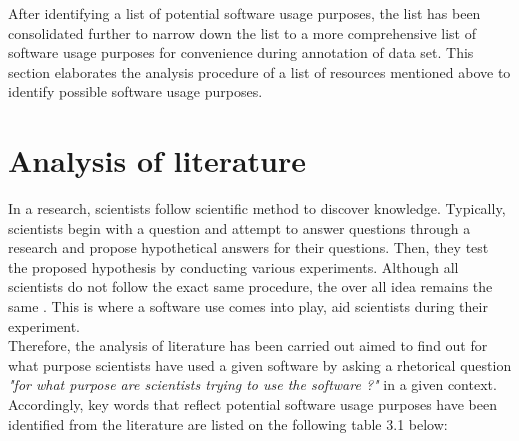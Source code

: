 After identifying a list of potential software usage purposes, the list has been consolidated further to narrow down the list to a more comprehensive list of software usage purposes for convenience during annotation of data set. This section elaborates the analysis procedure of a list of resources mentioned above to identify possible software usage purposes. \\
 

\section{Analysis of literature }
\label{sec:purpose:literatures}

In a research, scientists follow scientific method to discover knowledge. Typically, scientists begin with a question and attempt to answer questions through a research and propose hypothetical answers for their questions. Then, they test the proposed hypothesis by conducting various experiments. Although all scientists do not follow the exact same procedure, the over all idea remains the same \citep{enwiki:1061107378}. This is where a software use comes into play, aid scientists during their experiment. \\

Therefore, the analysis of literature has been carried out aimed to find out for what purpose scientists have used a given software by asking a rhetorical question \emph{ "for what purpose are scientists trying to use the software ?"} in a given context. \\

Accordingly, key words that reflect potential software usage purposes have been identified from the literature are listed on the following table 3.1 below: \\

